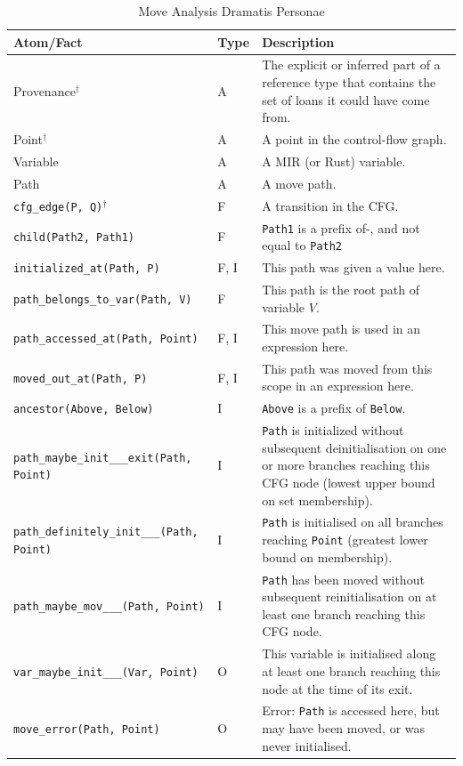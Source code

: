\documentclass[11pt,a4paper,twoside,openany]{report}
\newcommand{\notmine}[0] {$^\dagger$}
\newcommand{\InDatalog}[1]{\texttt{#1}}
\begin{document}
{ \renewcommand{\arraystretch}{1.0}
\begin{table}[h]
  \begin{tabular}{@{}l l m{5.5cm}}
    Atom/Fact & Type & Description \\ \hline
    Provenance\notmine & A & The explicit or inferred part of a reference type that contains the set of loans it could have come from.  \\
    Point\notmine & A & A point in the control-flow graph. \\
    Variable & A & A MIR (or Rust) variable. \\
    Path & A & A move path. \\
    \InDatalog{cfg_edge(P, Q)}\notmine & F & A transition in the CFG. \\
    \InDatalog{child(Path2, Path1)} & F & \InDatalog{Path1} is a prefix of-, and not equal to \InDatalog{Path2}  \\
    \InDatalog{initialized_at(Path, P)} & F, I & This path was given a value here. \\
    \InDatalog{path_belongs_to_var(Path, V)} & F & This path is the root path of variable $V$. \\
    \InDatalog{path_accessed_at(Path, Point)} & F, I & This move path is used in an expression here.\\
    \InDatalog{moved_out_at(Path, P)} & F, I & This path was moved from this scope in an expression here. \\
    \InDatalog{ancestor(Above, Below)} & I & \InDatalog{Above} is a prefix of \InDatalog{Below}.\\
    \InDatalog{path_maybe_init___exit(Path, Point)} & I & \InDatalog{Path} is initialized without subsequent deinitialisation on one or more branches reaching this CFG node (lowest upper bound on set membership).\\
    \InDatalog{path_definitely_init___(Path, Point)} & I &  \InDatalog{Path} is initialised on all branches reaching \InDatalog{Point} (greatest lower bound on membership). \\
    \InDatalog{path_maybe_mov___(Path, Point)} & I & \InDatalog{Path} has been moved without subsequent reinitialisation on at least one branch reaching this CFG node. \\
    \InDatalog{var_maybe_init___(Var, Point)} & O & This variable is initialised along at least one branch reaching this node at the time of its exit. \\
    \InDatalog{move_error(Path, Point)} & O & Error: \InDatalog{Path} is accessed here, but may have been moved, or was never initialised. \\
  \end{tabular}
\caption{Move Analysis Dramatis Personae}
  \label{tab:move-facts-recap}
\end{table}%
}
\end{document}
